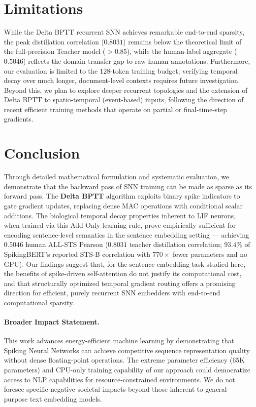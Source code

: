 \documentclass[runningheads]{llncs}
\begin{document}
\section{Limitations}
While the Delta BPTT recurrent SNN achieves remarkable end-to-end sparsity, the peak distillation correlation ($0.8031$) remains below the theoretical limit of the full-precision Teacher model ($>0.85$), while the human-label aggregate ($0.5046$) reflects the domain transfer gap to raw human annotations. Furthermore, our evaluation is limited to the $128$-token training budget; verifying temporal decay over much longer, document-level contexts requires future investigation. Beyond this, we plan to explore deeper recurrent topologies and the extension of Delta BPTT to spatio-temporal (event-based) inputs, following the direction of recent efficient training methods that operate on partial or final-time-step gradients.

\section{Conclusion}
Through detailed mathematical formulation and systematic evaluation, we demonstrate that the backward pass of SNN training can be made as sparse as its forward pass. The \textbf{Delta BPTT} algorithm exploits binary spike indicators to gate gradient updates, replacing dense MAC operations with conditional scalar additions. The biological temporal decay properties inherent to LIF neurons, when trained via this Add-Only learning rule, prove empirically sufficient for encoding sentence-level semantics in the sentence embedding setting --- achieving $0.5046$ human ALL-STS Pearson ($0.8031$ teacher distillation correlation; $93.4\%$ of SpikingBERT's reported STS-B correlation with $770\times$ fewer parameters and no GPU). Our findings suggest that, for the sentence embedding task studied here, the benefits of spike-driven self-attention do not justify its computational cost, and that structurally optimized temporal gradient routing offers a promising direction for efficient, purely recurrent SNN embedders with end-to-end computational sparsity.

\paragraph{Broader Impact Statement.} This work advances energy-efficient machine learning by demonstrating that Spiking Neural Networks can achieve competitive sequence representation quality without dense floating-point operations. The extreme parameter efficiency ($65$K parameters) and CPU-only training capability of our approach could democratize access to NLP capabilities for resource-constrained environments. We do not foresee specific negative societal impacts beyond those inherent to general-purpose text embedding models.
\end{document}
